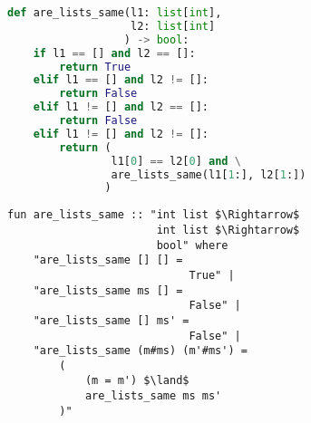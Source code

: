 \documentclass[a4paper]{article}
\begin{document}
\begin{minipage}[t]{0.5\textwidth}
    \begin{lstlisting}[language=python]
def are_lists_same(l1: list[int],
                   l2: list[int]
                  ) -> bool:
    if l1 == [] and l2 == []:
        return True
    elif l1 == [] and l2 != []:
        return False
    elif l1 != [] and l2 == []:
        return False
    elif l1 != [] and l2 != []:
        return (
                l1[0] == l2[0] and \
                are_lists_same(l1[1:], l2[1:])
               )
    \end{lstlisting}
\end{minipage}
\begin{minipage}[t]{0.5\textwidth}
    \begin{lstlisting}[language=isabelle]
fun are_lists_same :: "int list $\Rightarrow$
                       int list $\Rightarrow$
                       bool" where
    "are_lists_same [] [] =
                            True" |
    "are_lists_same ms [] = 
                            False" |
    "are_lists_same [] ms' = 
                            False" |
    "are_lists_same (m#ms) (m'#ms') =
        (
            (m = m') $\land$ 
            are_lists_same ms ms'
        )"
    \end{lstlisting}
\end{minipage}
\end{document}
